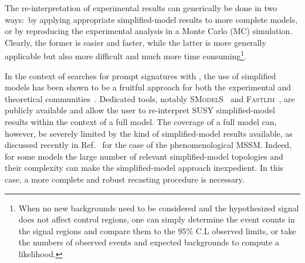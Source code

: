 The re-interpretation of experimental results can generically be done in two ways:~by applying
appropriate simplified-model results to more complete models, or by reproducing the experimental analysis in a Monte Carlo (MC) simulation.
Clearly,  the former is easier and faster,
while the latter is more generally applicable but also more difficult and much more time consuming\footnote{When no new backgrounds
need to be considered and the hypothesized signal does not affect control regions, one can simply determine the
event counts in the signal regions and compare them to the $95\%$ C.L observed limits, or take the numbers of observed events and expected backgrounds to compute a likelihood.}.

In the context of searches for prompt signatures with \MET, the use of simplified models has been shown to be a fruitful approach for both the experimental and theoretical communities~\cite{ArkaniHamed:2007fw, Alwall:2008ag, Alves:2011wf, Okawa:2011xg,Chatrchyan:2013sza,Abercrombie:2015wmb,Boveia:2016mrp}.
Dedicated tools, notably \textsc{SModelS}~\cite{Kraml:2013mwa,Ambrogi:2017neo} and \textsc{Fastlim}~\cite{Papucci:2014rja},
are publicly available and allow the user to re-interpret SUSY simplified-model results within the context of a full model.
The coverage of a full model can, however, be severely limited by the kind of simplified-model results available,
as discussed recently in Ref.~\cite{Ambrogi:2017lov} for the case of the phenomenological MSSM.
Indeed, for some models the large number of relevant simplified-model topologies and their complexity
can make the simplified-model approach inexpedient.
In this case, a more complete and robust recasting procedure is necessary.

